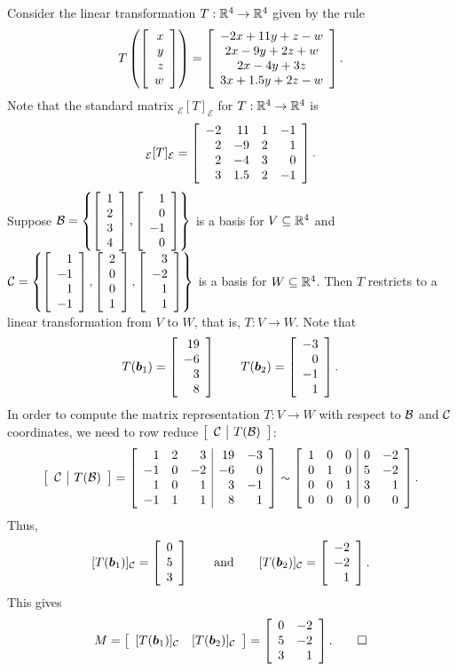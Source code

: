 \begin{Exam} Consider the linear transformation $T:\R^4\to\R^4$ given by the rule
\[T\left(\vr{x\\y\\z\\w}\right) = \mtx{c}{-2x+11y+z-w\\2x-9y+2z+w\\2x-4y+3z\\3x+1.5y+2z-w}.\] Note that the standard matrix $_\mathcal{E}[T]_\mathcal{E}$ for $T:\R^4\to \R^4$ is 
\[_\mathcal{E}[T]_\mathcal{E} = \mtx{rrrr}{-2&11&1&-1\\2&-9&2&1\\2&-4&3&0\\3&1.5&2&-1}.\]
Suppose $\B = \left\{\vr{1\\2\\3\\4}, \vr{1\\0\\-1\\0}\right\}$ is a basis for $V\subseteq \R^4$ and $\c = \left\{\vr{1\\-1\\1\\-1}, \vr{2\\0\\0\\1}, \vr{3\\-2\\1\\1}\right\}$ is a basis for $W\subseteq \R^4$. Then $T$ restricts to a linear transformation from $V$ to $W$, that is, $T:V\to W$. Note that \[T(\bb b_1) = \vr{19\\-6\\3\\8} \qquad T(\bb b_2) = \vr{-3\\0\\-1\\1}.\]
In order to compute the matrix representation $T:V\to W$ with respect to $\B$ and $\c$ coordinates, we need to row reduce $\mtx{r|r}{\c & T(\B)}$:
\[\mtx{r|r}{\c & T(\B)} = \mtx{rrr|rr}{1&2&3&19&-3\\-1&0&-2&-6&0\\1&0&1&3&-1\\-1&1&1&8&1} \sim \mtx{rrr|rr}{1&0&0&0&-2\\0&1&0&5&-2\\0&0&1&3&1\\0&0&0&0&0}.\] Thus, 
\[[T(\bb b_1)]_\c =  \vr{0\\5\\3}\qquad\text{and}\qquad [T(\bb b_2)]_\c =  \vr{-2\\-2\\1}.\] This gives
\[M = \mtx{cc}{[T(\bb b_1)]_\c & [T(\bb b_2)]_\c} =\mtx{rr}{0&-2\\5&-2\\3&1}.\qedhere\]
\end{Exam}\vs

